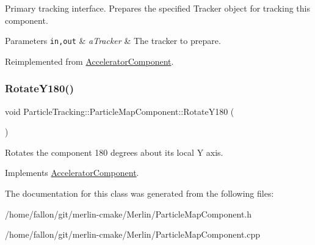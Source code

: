 Primary tracking interface. Prepares the specified Tracker object for tracking this component. 
\begin{DoxyParams}[1]{Parameters}
\mbox{\tt in,out}  & {\em a\+Tracker} & The tracker to prepare. \\
\hline
\end{DoxyParams}


Reimplemented from \hyperlink{classAcceleratorComponent_ab897c54689ac946f40c3ad0716ddd4bb}{Accelerator\+Component}.

\mbox{\label{classParticleTracking_1_1ParticleMapComponent_a32c2b78fc4688e14006f906d5e321d10}} 
\subsubsection{\texorpdfstring{Rotate\+Y180()}{RotateY180()}}
{\footnotesize\ttfamily void Particle\+Tracking\+::\+Particle\+Map\+Component\+::\+Rotate\+Y180 (\begin{DoxyParamCaption}{ }\end{DoxyParamCaption})\hspace{0.3cm}{\ttfamily [virtual]}}

Rotates the component 180 degrees about its local Y axis. 

Implements \hyperlink{classAcceleratorComponent_a8bf0d39b56578ca99f286ca1504b9072}{Accelerator\+Component}.



The documentation for this class was generated from the following files\+:\begin{DoxyCompactItemize}
\item 
/home/fallon/git/merlin-\/cmake/\+Merlin/Particle\+Map\+Component.\+h\item 
/home/fallon/git/merlin-\/cmake/\+Merlin/Particle\+Map\+Component.\+cpp\end{DoxyCompactItemize}
